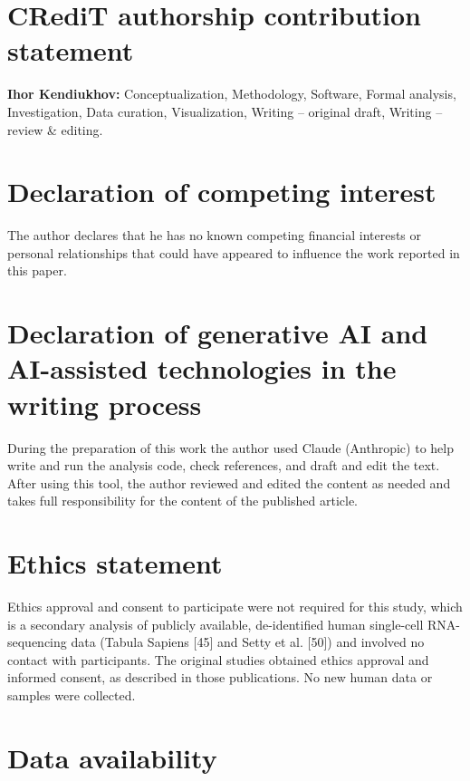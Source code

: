 \documentclass[
  11pt,
]{article}
\begin{document}
\section{CRediT authorship contribution
statement}\label{credit-authorship-contribution-statement}

\textbf{Ihor Kendiukhov:} Conceptualization, Methodology, Software,
Formal analysis, Investigation, Data curation, Visualization, Writing --
original draft, Writing -- review \& editing.

\section{Declaration of competing
interest}\label{declaration-of-competing-interest}

The author declares that he has no known competing financial interests
or personal relationships that could have appeared to influence the work
reported in this paper.

\section{Declaration of generative AI and AI-assisted technologies in
the writing
process}\label{declaration-of-generative-ai-and-ai-assisted-technologies-in-the-writing-process}

During the preparation of this work the author used Claude (Anthropic)
to help write and run the analysis code, check references, and draft and
edit the text. After using this tool, the author reviewed and edited the
content as needed and takes full responsibility for the content of the
published article.

\section{Ethics statement}\label{ethics-statement}

Ethics approval and consent to participate were not required for this
study, which is a secondary analysis of publicly available,
de-identified human single-cell RNA-sequencing data (Tabula Sapiens
{[}45{]} and Setty et al. {[}50{]}) and involved no contact with
participants. The original studies obtained ethics approval and informed
consent, as described in those publications. No new human data or
samples were collected.

\section{Data availability}\label{data-availability}
\end{document}
